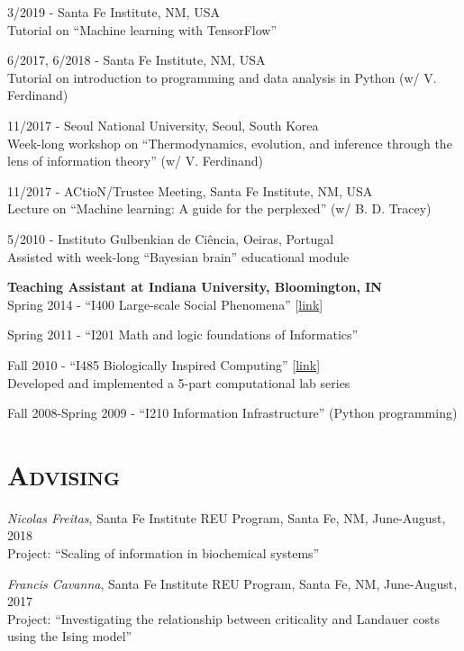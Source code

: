 \documentclass[margin,line,centered]{res}
\begin{document}
\begin{resume}
3/2019 - Santa Fe Institute, NM, USA\\
Tutorial on ``Machine learning with TensorFlow''

6/2017, 6/2018 - Santa Fe Institute, NM, USA\\
Tutorial on introduction to programming and data analysis in Python (w/ V. Ferdinand)

11/2017 - Seoul National University, Seoul, South Korea \\
Week-long workshop on ``Thermodynamics, evolution, and inference through the lens of information theory'' (w/ V. Ferdinand)

11/2017 - ACtioN/Trustee Meeting, Santa Fe Institute, NM, USA\\
Lecture on ``Machine learning: A guide for the perplexed'' (w/ B. D. Tracey)

5/2010 - Instituto Gulbenkian de Ciência, Oeiras, Portugal\\
Assisted with week-long ``Bayesian brain'' educational module

\vspace{5pt}

\textbf{Teaching Assistant at Indiana University, Bloomington, IN}\\
Spring 2014 - ``I400 Large-scale Social Phenomena'' {[}\href{http://tuvalu.santafe.edu/~simon/page11/page11.html}{link}{]} 

Spring 2011 - ``I201 Math and logic foundations of Informatics''

Fall 2010 - ``I485 Biologically Inspired Computing'' {[}\href{https://web.archive.org/web/20110310071102/http://www.informatics.indiana.edu/rocha/i-bic/index.html}{link}{]}\\
Developed and implemented a 5-part computational lab series

Fall 2008-Spring 2009 - ``I210 Information Infrastructure'' (Python programming)



\section{\textsc{Advising}}
\emph{Nicolas Freitas}, Santa Fe Institute REU Program, Santa Fe, NM, June-August, 2018 \\
Project: ``Scaling of information in biochemical systems''

\emph{Francis Cavanna}, Santa Fe Institute REU Program, Santa Fe, NM, June-August, 2017 \\
Project: ``Investigating the relationship between criticality and Landauer costs using the Ising model''


\end{resume}
\end{document}
